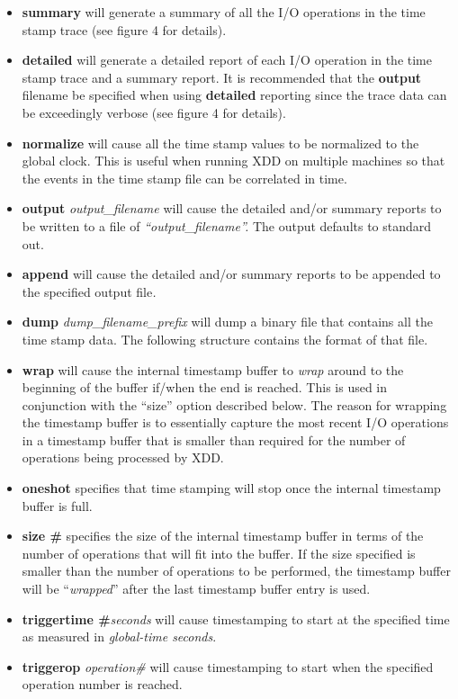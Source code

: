 \begin{itemize}
\item
  \textbf{summary} will generate a summary of all the I/O operations in the time stamp trace (see figure 4 for details).
\item
  \textbf{detailed} will generate a detailed report of each I/O operation in the time stamp trace and a summary report. It is recommended that the \textbf{output} filename be specified when using \textbf{detailed} reporting since the trace data can be exceedingly verbose (see figure 4 for details).
\item
  \textbf{normalize} will cause all the time stamp values to be normalized to the global clock. This is useful when running XDD on multiple machines so that the events in the time stamp file can be correlated in time.
\item
  \textbf{output} \emph{output\_filename} will cause the detailed and/or summary reports to be written to a file of \emph{``output\_filename''.} The output defaults to standard out.
\item
  \textbf{append} will cause the detailed and/or summary reports to be appended to the specified output file\emph{.}
\item
  \textbf{dump} \emph{dump\_filename\_prefix} will dump a binary file that contains all the time stamp data. The following structure contains the format of that file.
\item
  \textbf{wrap} will cause the internal timestamp buffer to \emph{wrap} around to the beginning of the buffer if/when the end is reached. This is used in conjunction with the ``size'' option described below. The reason for wrapping the timestamp buffer is to essentially capture the most recent I/O operations in a timestamp buffer that is smaller than required for the number of operations being processed by XDD.
\item
  \textbf{oneshot} specifies that time stamping will stop once the internal timestamp buffer is full.
\item
  \textbf{size \#} specifies the size of the internal timestamp buffer in terms of the number of operations that will fit into the buffer. If the size specified is smaller than the number of operations to be performed, the timestamp buffer will be ``\emph{wrapped}'' after the last timestamp buffer entry is used.
\item
  \textbf{triggertime \#}\emph{seconds} will cause timestamping to start at the specified time as measured in \emph{global-time seconds}.
\item
  \textbf{triggerop} \emph{operation\#} will cause timestamping to start when the specified operation number is reached.
\end{itemize}

